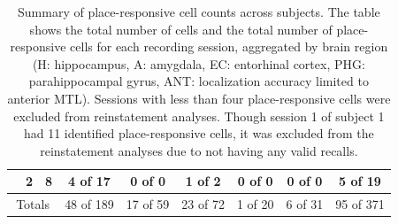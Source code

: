 \begin{table}[ph]
\begin{tabular}{|ccc|ccccc||c|}
      & 2 & 8 & 4 of 17 & 0 of 0 & 1 of 2 & 0 of 0 & 0 of 0 & 5 of 19\\
\hline
\multicolumn{3}{c|}{Totals} & 48 of 189 & 17 of 59 & 23 of 72 & 1 of 20 & 6 of 31 & \multicolumn{1}{c}{95 of 371}\\
    \end{tabular}
  \caption[Summary of place-responsive cells]{Summary of place-responsive cell counts across subjects. The table shows the total number of cells and the total number of place-responsive cells for each recording session, aggregated by brain region (H: hippocampus, A: amygdala, EC: entorhinal cortex, PHG: parahippocampal gyrus, ANT: localization accuracy limited to anterior MTL). Sessions with less than four place-responsive cells were excluded from reinstatement analyses. Though session 1 of subject 1 had 11 identified place-responsive cells, it was excluded from the reinstatement analyses due to not having any valid recalls.}
\label{tab:counts}
\end{table}

\clearpage



